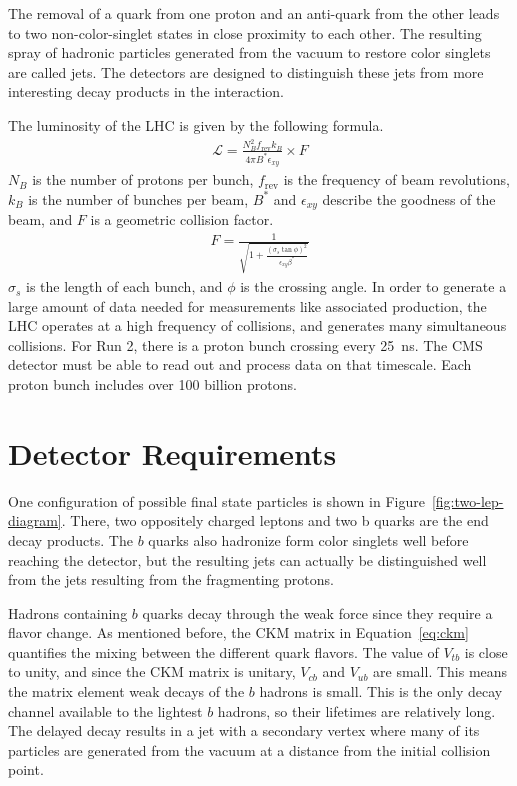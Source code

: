 The removal of a quark from one proton and an anti-quark from the other leads to two
non-color-singlet states in close proximity to each other.
The resulting spray of hadronic particles generated from the vacuum to restore
color singlets are called jets.
The detectors are designed to distinguish these jets from more interesting decay products
in the interaction.

The luminosity of the LHC is given by the following formula.
\begin{gather}
  \mathcal{L} = \frac{N^2_B f_{\text{rev}} k_B}{4\pi B^* \epsilon_{xy}} \times F
\end{gather}
$N_B$ is the number of protons per bunch,
$f_{\text{rev}}$ is the frequency of beam revolutions,
$k_B$ is the number of bunches per beam,
$B^*$ and $\epsilon_{xy}$ describe the goodness of the beam,
and $F$ is a geometric collision factor.
\begin{gather}
  F = \frac{1}{\sqrt{1 + \frac{(\sigma_s \tan \phi)^2}{\epsilon_{xy} \beta^*}}}
\end{gather}
$\sigma_s$ is the length of each bunch,
and $\phi$ is the crossing angle.
In order to generate a large amount of data needed for measurements like associated production,
the LHC operates at a high frequency of collisions, and generates many simultaneous collisions.
For Run 2, there is a proton bunch crossing every \SI{25}{ns}.
The CMS detector must be able to read out and process data on that timescale.
Each proton bunch includes over 100 billion protons\cite{Bruce:2201447}.

\section{Detector Requirements}

One configuration of possible final state particles is shown in Figure~\ref{fig:two-lep-diagram}.
There, two oppositely charged leptons and two b quarks are the end decay products.
The $b$ quarks also hadronize form color singlets well before reaching the detector,
but the resulting jets can actually be distinguished well from the jets resulting
from the fragmenting protons.

Hadrons containing $b$ quarks decay through the weak force since they require a flavor change.
As mentioned before, the CKM matrix in Equation~\ref{eq:ckm} quantifies the mixing between the different quark flavors.
The value of $V_{tb}$ is close to unity, and since the CKM matrix is unitary,
$V_{cb}$ and $V_{ub}$ are small.
This means the matrix element weak decays of the $b$ hadrons is small.
This is the only decay channel available to the lightest $b$ hadrons,
so their lifetimes are relatively long.
The delayed decay results in a jet with a secondary vertex where many of its particles
are generated from the vacuum at a distance from the initial collision point.

